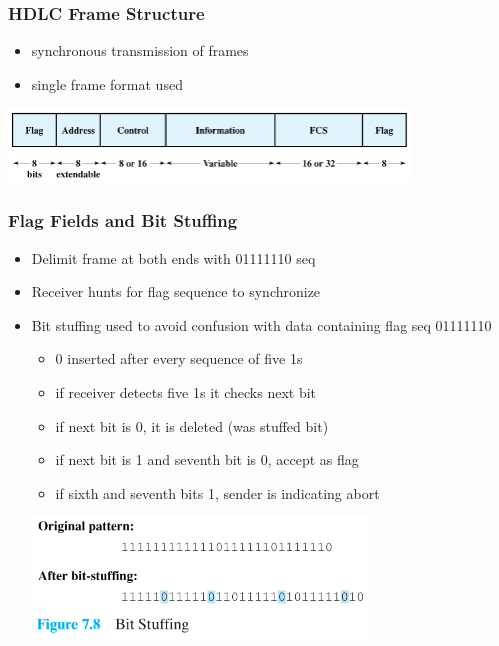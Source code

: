 \documentclass[pdflatex,compress]{beamer}
\begin{document}
\begin{frame}
	\frametitle{HDLC Frame Structure}
	\begin{itemize}
		\item synchronous transmission of frames
		\item single frame format used
	\end{itemize}
	\begin{center}
		\includegraphics[width=0.8\textwidth]{img/img08}
	\end{center}
\end{frame}

\begin{frame}
	\frametitle{Flag Fields and Bit Stuffing}
	\begin{itemize}
		\item Delimit frame at both ends with 01111110 seq
		\item Receiver hunts for flag sequence to synchronize
		\item Bit stuffing used to avoid confusion with data containing flag seq 01111110
		\begin{itemize}
			\item 0 inserted after every sequence of five 1s
			\item if receiver detects five 1s it checks next bit
			\item if next bit is 0, it is deleted (was stuffed bit)
			\item if next bit is 1 and seventh bit is 0, accept as flag
			\item if sixth and seventh bits 1, sender is indicating abort
		\end{itemize}
		\begin{center}
			\includegraphics[width=0.7\textwidth]{img/img09}
		\end{center}
	\end{itemize}
\end{frame}
\end{document}
